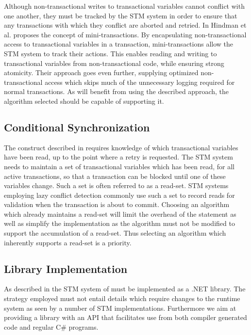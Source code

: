 Although non-transactional writes to transactional variables cannot conflict with one another, they must be tracked by the \ac{STM} system in order to ensure that any transactions with which they conflict are aborted and retried. In \cite{hindman2006atomicity} Hindman et al. proposes the concept of mini-transactions. By encapsulating non-transactional access to transactional variables in a transaction, mini-transactions allow the \ac{STM} system to track their actions. This enables reading and writing to transactional variables from non-transactional code, while ensuring strong atomicity. Their approach goes even further, supplying optimized non-transactional access which skips much of the unnecessary logging required for normal transactions. As \stmnamesp will benefit from using the described approach, the algorithm selected should be capable of supporting it.
 
\subsection{Conditional Synchronization}
\label{subsec:stm_impl_selection_conditional}
The  construct described in  requires knowledge of which transactional variables have been read, up to the point where a retry is requested\cite{harris2005composable}. The \ac{STM} system needs to maintain a set of transactional variables which has been read, for all active transactions, so that a transaction can be blocked until one of these variables change. Such a set is often referred to as a read-set\cite{dice2006transactional}\cite{harris2010transactional}\cite{herlihy2012art}. \ac{STM} systems employing lazy conflict detection commonly use such a set to record reads for validation when the transaction is about to commit\cite{dice2006transactional}\cite{mohamedin2013bytestm}. Choosing an algorithm which already maintains a read-set will limit the overhead of the  statement as well as simplify the implementation as the algorithm must not be modified to support the accumulation of a read-set. Thus selecting an algorithm which inherently supports a read-set is a priority.

\subsection{Library Implementation}
As described in \bsref{} the \ac{STM} system of \stmnamesp must be implemented as a .NET library. The strategy employed must not entail details which require changes to the runtime system as seen by a number of \ac{STM} implementations\cite{mohamedin2013bytestm}\cite{harris2003language}. Furthermore we aim at providing a library with an \ac{API} that facilitates use from both compiler generated code and regular C\# programs.

